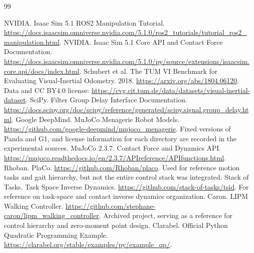 \begin{thebibliography}{99}
 NVIDIA. Isaac Sim 5.1 ROS2 Manipulation Tutorial. \url{https://docs.isaacsim.omniverse.nvidia.com/5.1.0/ros2_tutorials/tutorial_ros2_manipulation.html}.
 NVIDIA. Isaac Sim 5.1 Core API and Contact Force Documentation. \url{https://docs.isaacsim.omniverse.nvidia.com/5.1.0/py/source/extensions/isaacsim.core.api/docs/index.html}.
 Schubert et al. The TUM VI Benchmark for Evaluating Visual-Inertial Odometry. 2018. \url{https://arxiv.org/abs/1804.06120}. Data and CC BY4.0 license: \url{https://cvg.cit.tum.de/data/datasets/visual-inertial-dataset}.
 SciPy. Filter Group Delay Interface Documentation. \url{https://docs.scipy.org/doc/scipy/reference/generated/scipy.signal.group_delay.html}.
 Google DeepMind. MuJoCo Menagerie Robot Models. \url{https://github.com/google-deepmind/mujoco_menagerie}. Fixed versions of Panda and G1, and license information for each directory are recorded in the experimental sources.
 MuJoCo 2.3.7. Contact Force and Dynamics API. \url{https://mujoco.readthedocs.io/en/2.3.7/APIreference/APIfunctions.html}.
 Rhoban. PlaCo. \url{https://github.com/Rhoban/placo}. Used for reference motion tasks and gait hierarchy, but not the entire control stack was integrated.
 Stack of Tasks. Task Space Inverse Dynamics. \url{https://github.com/stack-of-tasks/tsid}. For reference on task-space and contact inverse dynamics organization.
 Caron. LIPM Walking Controller. \url{https://github.com/stephane-caron/lipm_walking_controller}. Archived project, serving as a reference for control hierarchy and zero-moment point design.
 Clarabel. Official Python Quadratic Programming Example. \url{https://clarabel.org/stable/examples/py/example_qp/}.
\end{thebibliography}
